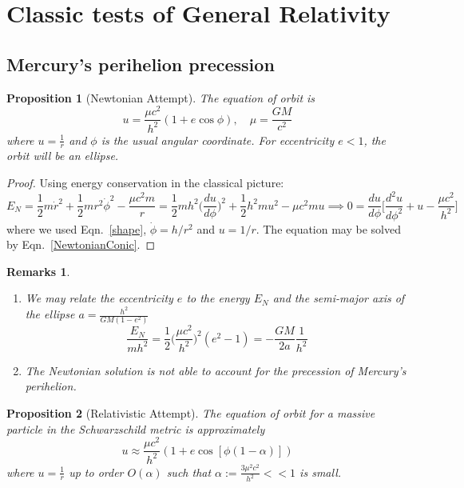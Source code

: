 \documentclass[a4paper]{article}
\newtheorem{remarks}{Remarks}[section]
\theoremstyle{new}
\newtheorem{prop}{Proposition}[section]
\begin{document}
\section{Classic tests of General Relativity}
\subsection{Mercury's perihelion precession}
\begin{prop}[Newtonian Attempt]
The equation of orbit is
\begin{equation}
u=\frac{\mu c^2}{h^2}(1+e\cos\phi),\quad\mu=\frac{GM}{c^2}\label{NewtonianConic}
\end{equation}
where $u=\frac{1}{r}$ and $\phi$ is the usual angular coordinate. For eccentricity $e<1$, the orbit will be an ellipse.
\end{prop}
\begin{proof}
Using energy conservation in the classical picture:
$$E_N=\frac{1}{2}m\dot{r}^2+\frac{1}{2}mr^2\dot{\phi}^2-\frac{\mu c^2m}{r}=\frac{1}{2}mh^2\bigg(\frac{du}{d\phi}\bigg)^2+\frac{1}{2}h^2mu^2-\mu c^2 mu\implies 0=\frac{du}{d\phi}\bigg[\frac{d^2u}{d\phi^2}+u-\frac{\mu c^2}{h^2}\bigg]$$
where we used Eqn.~\ref{shape}, $\dot{\phi}=h/r^2$ and $u=1/r$. The equation may be solved by Eqn.~\ref{NewtonianConic}.
\end{proof}
\begin{remarks}\leavevmode
\begin{enumerate}
\item We may relate the eccentricity $e$ to the energy $E_N$ and the semi-major axis of the ellipse $a=\frac{h^2}{GM(1-e^2)}$
\begin{equation}
 \frac{E_N}{mh^2}=\frac{1}{2}\bigg(\frac{\mu c^2}{h^2}\bigg)^2(e^2-1)=-\frac{GM}{2a}\frac{1}{h^2}\label{axes}
\end{equation}
\item The Newtonian solution is not able to account for the precession of Mercury's perihelion.
\end{enumerate}
\end{remarks}
\begin{prop}[Relativistic Attempt]
The equation of orbit for a massive particle in the Schwarzschild metric is approximately
\begin{equation}
u\approx\frac{\mu c^2}{h^2}(1+e\cos[\phi(1-\alpha)])\label{relorbitsol}
\end{equation}
where $u=\frac{1}{r}$ up to order $O(\alpha)$ such that $\alpha:=\frac{3\mu^2c^2}{h^2}<<1$ is small.
\end{prop}
\end{document}
